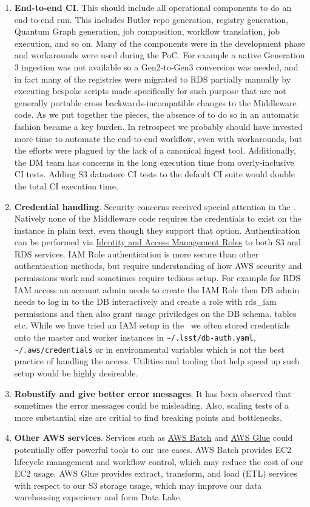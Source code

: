\begin{enumerate}
\item \textbf{End-to-end CI}.
This should include all operational components to do an end-to-end run.
This includes Butler repo generation, registry generation, Quantum Graph generation, job composition, workflow translation, job execution, and so on.
Many of the components were in the development phase and workarounds were used during the PoC.
For example a native Generation 3 ingestion was not available so a Gen2-to-Gen3 conversion was needed, and in fact many of the registries were migrated to RDS partially manually by executing bespoke scripts made specifically for such purpose that are not generally portable cross backwards-incompatible changes to the Middleware code.
As we put together the pieces, the absence of to do so in an automatic fashion became a key burden.
In retrospect we probably should have invested more time to automate the end-to-end workflow, even with workarounds, but the efforts were plagued by the lack of a canonical ingest tool. Additionally, the DM team has concerns in the long execution time from overly-inclusive CI tests. Adding S3 datastore CI tests to the default CI suite would double the total CI execution time.
\item \textbf{Credential handling}.
Security concerns received special attention in the \poc. Natively none of the Middleware code requires the credentials to exist on the instance in plain text, even though they support that option. Authentication can be performed via \href{https://docs.aws.amazon.com/IAM/latest/UserGuide/id_roles.html}{Identity and Access Management Roles} to both S3 and RDS services. IAM Role authentication is more secure than other authentication methods, but require understanding of how AWS security and permissions work and sometimes require tedious setup. For example for RDS IAM access an account admin needs to create the IAM Role then DB admin needs to log in to the DB interactively and create a role with rds\_iam permissions and then also grant usage priviledges on the DB schema, tables etc. While we have tried an IAM setup in the \poc~we often stored credentials onto the master and worker instances in \texttt{\~{}/.lsst/db-auth.yaml}, \texttt{\~{}/.aws/credentials} or in environmental variables which is not the best practice of handling the access. Utilities and tooling that help speed up such setup would be highly desireable. 
\item \textbf{Robustify and give better error messages}.
It has been observed that sometimes the error messages could be misleading.
Also, scaling tests of a more substantial size are critial to find breaking points and bottlenecks.
\item \textbf{Other AWS services}.
Services such as \href{https://aws.amazon.com/batch/}{AWS Batch} and \href{https://aws.amazon.com/glue/}{AWS Glue} could potentially offer powerful tools to our use cases.
AWS Batch provides EC2 lifecycle management and workflow control, which may reduce the cost of our EC2 usage.
AWS Glue provides extract, transform, and load (ETL) services with respect to our S3 storage usage, which may improve our data warehousing experience and form Data Lake.

\end{enumerate}

